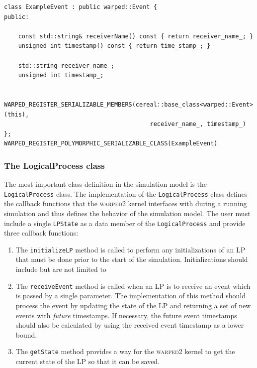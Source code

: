 \documentclass[11pt]{book}
\begin{document}
\begin{lstlisting}[caption=Example \textsc{warped2} Event Definition, label=event_example, float]
class ExampleEvent : public warped::Event {
public:

    const std::string& receiverName() const { return receiver_name_; }
    unsigned int timestamp() const { return time_stamp_; }

    std::string receiver_name_;
    unsigned int timestamp_;

    WARPED_REGISTER_SERIALIZABLE_MEMBERS(cereal::base_class<warped::Event>(this),
                                         receiver_name_, timestamp_)
};
WARPED_REGISTER_POLYMORPHIC_SERIALIZABLE_CLASS(ExampleEvent)
\end{lstlisting}

\subsubsection{The LogicalProcess class}

The most important class definition in the simulation model is the \texttt{LogicalProcess} class.
The implementation of the \texttt{LogicalProcess} class defines the callback functions that the
\textsc{warped2} kernel interfaces with during a running simulation and thus defines the behavior of
the simulation model.  The user must include a single \texttt{LPState} as a data member of the
\texttt{LogicalProcess} and provide three callback functions:

\begin{enumerate}
    \item The \texttt{initializeLP} method is called to perform any initializations of an LP that
      must be done prior to the start of the simulation.  Initializations should include but are not
      limited to 
    \item The \texttt{receiveEvent} method is called when an LP is to receive an event which is
      passed by a single parameter.  The implementation of this method should process the event by
      updating the state of the LP and returning a set of new events with \emph{future} timestamps.
      If necessary, the future event timestamps should also be calculated by using the received
      event timestamp as a lower bound.
    \item The \texttt{getState} method provides a way for the \textsc{warped2} kernel to get the
      current state of the LP so that it can be saved.
\end{enumerate}
\end{document}
